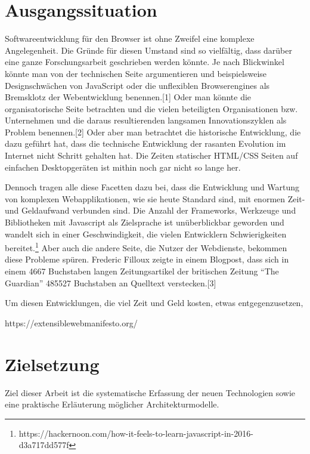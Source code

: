 \section{Ausgangssituation}\label{ausgangssituation}

Softwareentwicklung für den Browser ist ohne Zweifel eine komplexe
Angelegenheit. Die Gründe für diesen Umstand sind so vielfältig, dass
darüber eine ganze Forschungsarbeit geschrieben werden könnte. Je nach
Blickwinkel könnte man von der technischen Seite argumentieren und
beispielsweise Designschwächen von JavaScript oder die unflexiblen
Browserengines als Bremsklotz der Webentwicklung benennen.{[}1{]} Oder
man könnte die organisatorische Seite betrachten und die vielen
beteiligten Organisationen bzw. Unternehmen und die daraus
resultierenden langsamen Innovationszyklen als Problem benennen.{[}2{]}
Oder aber man betrachtet die historische Entwicklung, die dazu geführt
hat, dass die technische Entwicklung der rasanten Evolution im Internet
nicht Schritt gehalten hat. Die Zeiten statischer HTML/CSS Seiten auf
einfachen Desktopgeräten ist mithin noch gar nicht so lange her.

Dennoch tragen alle diese Facetten dazu bei, dass die Entwicklung und
Wartung von komplexen Webapplikationen, wie sie heute Standard sind, mit
enormen Zeit- und Geldaufwand verbunden sind. Die Anzahl der Frameworks,
Werkzeuge und Bibliotheken mit Javascript als Zielsprache ist
unüberblickbar geworden und wandelt sich in einer Geschwindigkeit, die
vielen Entwicklern Schwierigkeiten bereitet.\footnote{https://hackernoon.com/how-it-feels-to-learn-javascript-in-2016-d3a717dd577f}
Aber auch die andere Seite, die Nutzer der Webdienste, bekommen diese
Probleme spüren. Frederic Filloux zeigte in einem Blogpost, dass sich in
einem 4667 Buchstaben langen Zeitungsartikel der britischen Zeitung
``The Guardian'' 485527 Buchstaben an Quelltext verstecken.{[}3{]}

Um diesen Entwicklungen, die viel Zeit und Geld kosten, etwas
entgegenzusetzen,

https://extensiblewebmanifesto.org/

\section{Zielsetzung}\label{zielsetzung}

Ziel dieser Arbeit ist die systematische Erfassung der neuen
Technologien sowie eine praktische Erläuterung möglicher
Architekturmodelle.

